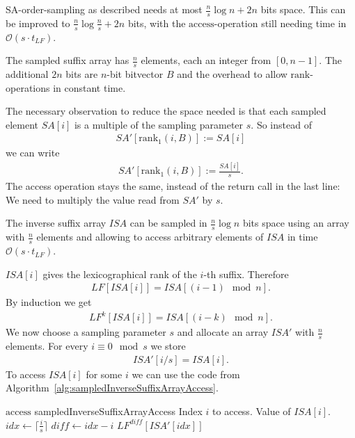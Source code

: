 \begin{Theorem}
  SA-order-sampling as described needs at most $\frac{n}{s}\log n + 2n$ bits space. This can be improved to $\frac{n}{s}\log\frac{n}{s} + 2n$ bits, with the $\mathrm{access}$-operation still needing time in $\mathcal{O}(s\cdot t_{LF})$.
\end{Theorem}

\begin{Proof}
  The sampled suffix array has $\frac{n}{s}$ elements, each an integer from $[0,n-1]$. The additional $2n$ bits are $n$-bit bitvector $B$ and the overhead to allow $\mathrm{rank}$-operations in constant time.

  The necessary observation to reduce the space needed is that each sampled element $SA[i]$ is a multiple of the sampling parameter $s$. So instead of \begin{align}
    SA'[\mathrm{rank}_1(i, B)] := SA[i]
  \end{align}
  we can write
  \begin{align}
    SA'[\mathrm{rank}_1(i, B)] := \frac{SA[i]}{s}
    \text{.}
  \end{align}
  The access operation stays the same, instead of the return call in the last line: We need to multiply the value read from $SA'$ by $s$.
\end{Proof}

\begin{Theorem}
  The inverse suffix array $ISA$ can be sampled in $\frac{n}{s}\log n$ bits space using an array with $\frac{n}{s}$ elements and allowing to access arbitrary elements of $ISA$ in time $\mathcal{O}(s\cdot t_{LF})$.
\end{Theorem}

\begin{Proof}
  $ISA[i]$ gives the lexicographical rank of the $i$-th suffix. Therefore
  \begin{align}
    LF[ISA[i]] = ISA[(i-1) \mod n]
    \text{.}
  \end{align}
  By induction we get
  \begin{align}
    LF^k[ISA[i]] = ISA[(i - k) \mod n]
    \text{.}
  \end{align}
  We now choose a sampling parameter $s$ and allocate an array $ISA'$ with $\frac{n}{s}$ elements. For every $i \equiv 0 \mod s$ we store
  \begin{align}
    ISA'[i/s] = ISA[i]
    \text{.}
  \end{align}
  To access $ISA[i]$ for some $i$ we can use the code from Algorithm~\ref{alg:sampledInverseSuffixArrayAccess}.
  \begin{pseudocode}
    {$\mathrm{access}$}
    {sampledInverseSuffixArrayAccess}
    {Index $i$ to access.}
    {Value of $ISA[i]$.}
    \STATE $idx \gets \lceil \frac{i}{s} \rceil$
    \STATE $diff \gets idx - i$
    \RETURN $LF^{diff}[ISA'[idx]]$
  \end{pseudocode}
\end{Proof}

